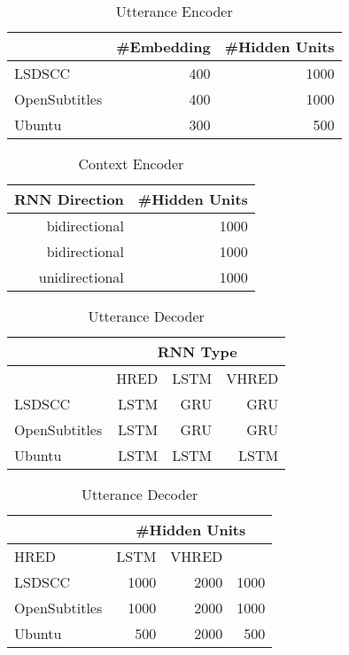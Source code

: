 \begin{table}
    \centering
    \caption{Utterance Encoder}
    \begin{tabular}{|l|r|r|}
        \hline
        & {\#Embedding} & {\#Hidden Units} \\
        \hline
        LSDSCC & 400 & 1000 \\
        \hline
        OpenSubtitles & 400 & 1000 \\
        \hline
        Ubuntu & 300 & 500 \\
        \hline
    \end{tabular}
\end{table}%

\begin{table}
    \centering
    \caption{Context Encoder}
    \begin{tabular}{|r|r|}
        \hline
        RNN Direction & \#Hidden Units \\
        \hline
        bidirectional & 1000 \\
        \hline
        bidirectional & 1000 \\
        \hline
        unidirectional & 1000 \\
        \hline
    \end{tabular}
\end{table}

\begin{table}
    \centering
    \caption{Utterance Decoder}
    \begin{tabular}{|l|*{3}{r|}}
        \hline
        & \multicolumn{3}{c|}{RNN Type} \\
        \hline
        & HRED & LSTM & VHRED \\
        \hline
        LSDSCC & LSTM & GRU & GRU \\
        \hline
        OpenSubtitles & LSTM & GRU & GRU \\
        \hline
        Ubuntu & LSTM & LSTM & LSTM \\
        \hline
    \end{tabular}
\end{table}

\begin{table}
    \centering
    \caption{Utterance Decoder}
    \begin{tabular}{|l|*{3}{r|}}
        \hline
        & \multicolumn{3}{c|}{\#Hidden Units} \\
        \hline
        HRED & LSTM & VHRED \\
        \hline
        LSDSCC & 1000 & 2000 & 1000 \\
        \hline
        OpenSubtitles & 1000 & 2000 & 1000 \\
        \hline
        Ubuntu & 500 & 2000 & 500 \\
        \hline
    \end{tabular}
\end{table}


